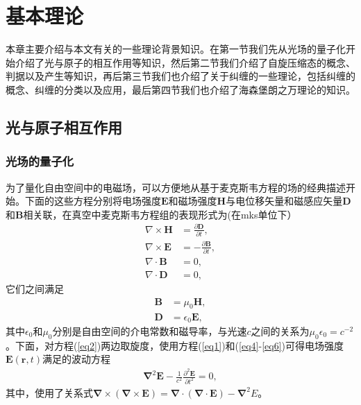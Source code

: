
\chapter{基本理论}\label{chapter2}
\vbox{}\vbox{}

本章主要介绍与本文有关的一些理论背景知识。在第一节我们先从光场的量子化开始介绍了光与原子的相互作用等知识，然后第二节我们介绍了自旋压缩态的概念、判据以及产生等知识，再后第三节我们也介绍了关于纠缠的一些理论，包括纠缠的概念、纠缠的分类以及应用，最后第四节我们也介绍了海森堡朗之万理论的知识。
\vspace{1cm}
\section{光与原子相互作用}
\vspace{1cm}
\subsection{光场的量子化}
为了量化自由空间中的电磁场，可以方便地从基于麦克斯韦方程的场的经典描述开始。下面的这些方程分别将电场强度$\bm{E}$和磁场强度$\bm{H}$与电位移矢量和磁感应矢量$\bm{D}$和$\bm{B}$相关联，在真空中麦克斯韦方程组\cite{pennarun2007tripartite}的表现形式为(在mks单位下）
\begin{align}
\nabla  \times \bm{ H} &=    \frac{{\partial \bm{ D}}}{{\partial t}},\label{eq1}\\
\nabla  \times \bm{ E} &=  - \frac{{\partial \bm{ B}}}{{\partial t}},\label{eq2}\\
\nabla  \cdot  \bm{ B} &= 0,\label{eq3}\\
\nabla  \cdot  \bm{ D} &= 0,\label{eq4}
\end{align}
它们之间满足
\begin{align}
\bm{ B} &= {\mu _0}\bm{H},\label{eq5}\\
\bm{ D }&= {\epsilon_0}\bm{ E},\label{eq6}
\end{align}
其中$\epsilon_0$和$\mu_0$分别是自由空间的介电常数和磁导率，与光速$c$之间的关系为${\mu _0}{\epsilon_0} = {c^{ - 2}}$。下面，对方程(\ref{eq2})两边取旋度，使用方程(\ref{eq1})和(\ref{eq4}-\ref{eq6})可得电场强度$\bm{E}(\bm{r},t)$满足的波动方程
\begin{align}
	{\bm{\nabla} ^2}\bm{E} - \frac{1}{{{c^2}}}\frac{{{\partial ^2}\bm{E}}}{{\partial {t^2}}} = 0,\label{eq7}
\end{align}
其中，使用了关系式$\bm{\nabla } \times \left( {\bm{\nabla}  \times \bm{E}} \right) = \bm{\nabla } \cdot \left( {\bm{\nabla } \cdot \bm{E}} \right) - {\bm{\nabla} ^2}E$。

